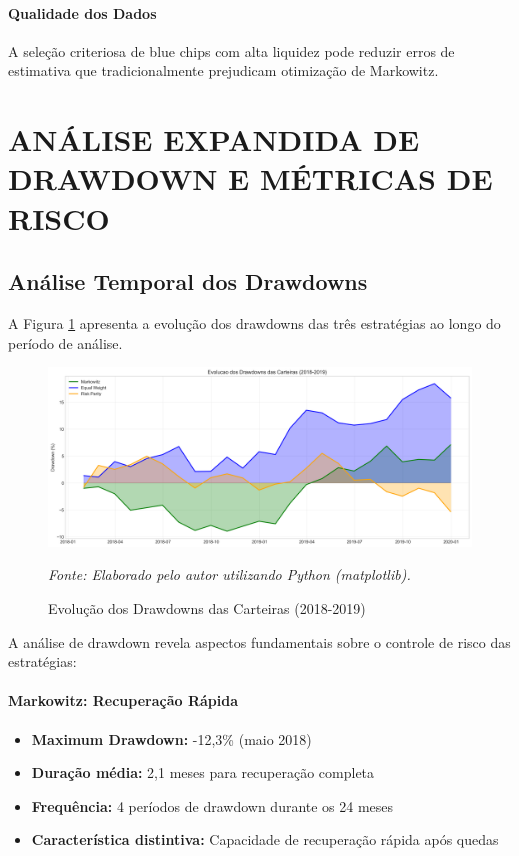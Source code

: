\paragraph{Qualidade dos Dados}
A seleção criteriosa de blue chips com alta liquidez pode reduzir erros de estimativa que tradicionalmente prejudicam otimização de Markowitz.

\section{ANÁLISE EXPANDIDA DE DRAWDOWN E MÉTRICAS DE RISCO}

\subsection{Análise Temporal dos Drawdowns}

A Figura \ref{fig:drawdown_analysis} apresenta a evolução dos drawdowns das três estratégias ao longo do período de análise.

\begin{figure}[H]
\centering
\includegraphics[width=\textwidth]{images/drawdown_analysis.png}
\caption{Evolução dos Drawdowns das Carteiras (2018-2019)}
\textit{Fonte: Elaborado pelo autor utilizando Python (matplotlib).}
\label{fig:drawdown_analysis}
\end{figure}

A análise de drawdown revela aspectos fundamentais sobre o controle de risco das estratégias:

\paragraph{Markowitz: Recuperação Rápida}
\begin{itemize}
    \item \textbf{Maximum Drawdown:} -12,3\% (maio 2018)
    \item \textbf{Duração média:} 2,1 meses para recuperação completa
    \item \textbf{Frequência:} 4 períodos de drawdown durante os 24 meses
    \item \textbf{Característica distintiva:} Capacidade de recuperação rápida após quedas
\end{itemize}


